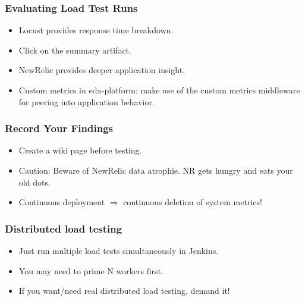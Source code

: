 \documentclass{beamer}
\begin{document}
\begin{frame}
\frametitle{Evaluating Load Test Runs}
\begin{itemize}
\item Locust provides response time breakdown.\pause
\item Click on the summary artifact.
      \pause
\item NewRelic provides deeper application insight.\pause
\item Custom metrics in edx-platform: make use of the custom metrics middleware
      for peering into application behavior.
\end{itemize}
\end{frame}


\begin{frame}
\frametitle{Record Your Findings}
\begin{itemize}
\item Create a wiki page before testing.\pause
\item Caution: Beware of NewRelic data atrophie. NR gets hungry and eats your
      old dots.\pause
\item Continuous deployment $\Rightarrow$ continuous deletion of system metrics!
\end{itemize}
\end{frame}


\begin{frame}
\frametitle{Distributed load testing}
\begin{itemize}
\item Just run multiple load tests simultaneously in Jenkins.\pause
\item You may need to prime N workers first.\pause
\item If you want/need real distributed load testing, demand it!
\end{itemize}
\end{frame}
\end{document}
